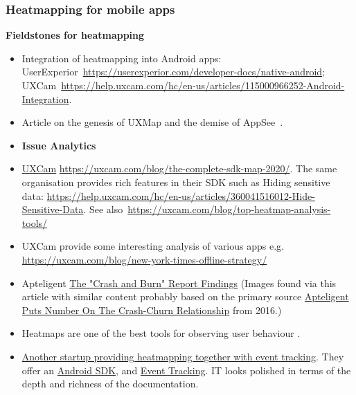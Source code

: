 
\subsubsection{Heatmapping for mobile apps}

\textbf{Fieldstones for heatmapping} 
\begin{itemize}
    \item Integration of heatmapping into Android apps: UserExperior~\url{https://userexperior.com/developer-docs/native-android}; UXCam~\url{https://help.uxcam.com/hc/en-us/articles/115000966252-Android-Integration}.
    \item Article on the genesis of UXMap and the demise of AppSee~\citep{uxcam_hackermoon_2020_heatmapping}.
    \item \textbf{Issue Analytics} 
    \item \href{https://uxcam.com/}{UXCam} \url{https://uxcam.com/blog/the-complete-sdk-map-2020/}. The same organisation provides rich features in their SDK such as Hiding sensitive data: \url{https://help.uxcam.com/hc/en-us/articles/360041516012-Hide-Sensitive-Data}. See also~\url{https://uxcam.com/blog/top-heatmap-analysis-tools/}
    \item UXCam provide some interesting analysis of various apps e.g. \url{https://uxcam.com/blog/new-york-times-offline-strategy/}
    \item Apteligent \href{https://www.apmdigest.com/the-crash-and-burn-report-findings}{The "Crash and Burn" Report Findings} (Images found via this article with similar content probably based on the primary source \href{https://www.androidheadlines.com/2016/12/apteligent-puts-number-crash-churn-relationship.html}{Apteligent Puts Number On The Crash-Churn Relationship} from 2016.)
    \item Heatmaps are one of the best tools for observing user behaviour \citep{inapptics2017_mobile_heatmap_visualise_user_behaviour}.
    \item \href{https://www.smartlook.com/mobile-analytics/}{Another startup providing heatmapping together with event tracking}. They offer an \href{https://smartlook.github.io/docs/sdk/android?platform=android}{Android SDK}, and \href{https://smartlook.github.io/docs/sdk/conceptual/event-tracking?platform=android}{Event Tracking}. IT looks polished in terms of the depth and richness of the documentation.
\end{itemize}

